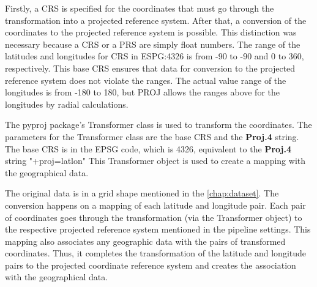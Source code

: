 


Firstly, a CRS is specified for the coordinates that must go through the transformation into a projected reference system.
After that, a conversion of the coordinates to the projected reference system is possible.
This distinction was necessary because a CRS or a PRS are simply float numbers.
The range of the latitudes and longitudes for CRS in ESPG:4326 is from -90 to -90 and 0 to 360, respectively.
This base CRS ensures that data for conversion to the projected reference system does not violate the ranges.
The actual value range of the longitudes is from -180 to 180, but PROJ allows the ranges above for the longitudes by radial calculations.

The pyproj package's Transformer class is used to transform the coordinates.
The parameters for the Transformer class are the base CRS and the \textbf{Proj.4} string. The base CRS is in the EPSG code, which is 4326, equivalent to the \textbf{Proj.4} string "+proj=latlon" This Transformer object is used to create a mapping with the geographical data.

The original data is in a grid shape mentioned in the \autoref{chap:dataset}. The conversion happens on a mapping of each latitude and longitude pair. Each pair of coordinates goes through the transformation (via the Transformer object) to the respective projected reference system mentioned in the pipeline settings.
This mapping also associates any geographic data with the pairs of transformed coordinates.
Thus, it completes the transformation of the latitude and longitude pairs to the projected coordinate reference system and creates the association with the geographical data.



